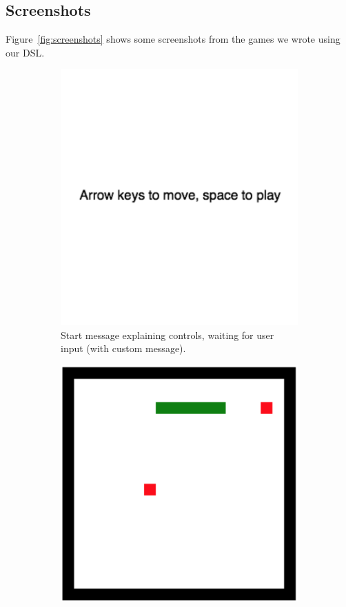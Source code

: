 \documentclass[journal,onecolumn, 9pt]{IEEEtran}
\theoremstyle{definition}
\begin{document}
\subsection{Screenshots}
Figure~\ref{fig:screenshots} shows some screenshots from the games we wrote using our DSL.
\begin{figure}
	\centering
	\begin{subfigure}[t]{0.32\textwidth}
		\centering
		\includegraphics[width=\textwidth]{img/start_message.png}
		\caption{Start message explaining controls, waiting for user input (with custom message).}
		\label{fig:sc1}
	\end{subfigure}
	\hfill
	\begin{subfigure}[t]{0.32\textwidth}  
		\centering 
		\includegraphics[width=\textwidth]{img/snake_gameplay.png}

\end{subfigure}
\end{figure}
\end{document}
